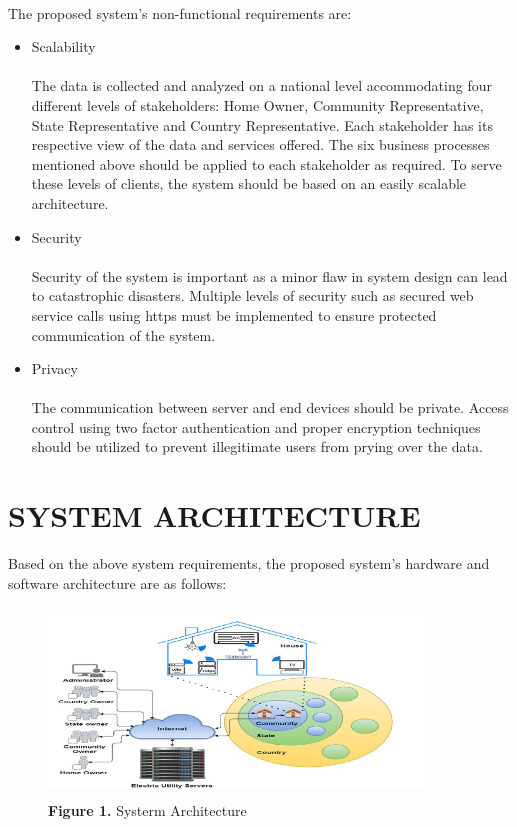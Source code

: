 \documentclass[a4paper,12pt,oneside]{article}
\let\counterwithin\relax
\begin{document}
\paragraph{}
The proposed system’s non-functional requirements are:
\begin{itemize}
    \item Scalability
    \paragraph{}The data is collected and analyzed on a national level
    accommodating four different levels of stakeholders: Home
    Owner, Community Representative, State Representative
    and Country Representative. Each stakeholder has
    its respective view of the data and services offered. The
    six business processes mentioned above should be applied
    to each stakeholder as required. To serve these levels of
    clients, the system should be based on an easily scalable
    architecture.
    \item Security
    \paragraph{}Security of the system is important as a minor flaw in
    system design can lead to catastrophic disasters. Multiple
    levels of security such as secured web service calls using https
    must be implemented to ensure protected communication of
    the system.
    \item Privacy
    \paragraph{}
    The communication between server and end devices should
    be private. Access control using two factor authentication and
    proper encryption techniques should be utilized to prevent
    illegitimate users from prying over the data.
    
\end{itemize}

\newpage
\section{SYSTEM ARCHITECTURE}
Based on the above system requirements, the proposed
system’s hardware and software architecture are as follows:

\begin{figure}[H]
\includegraphics[height=5cm,width=10cm]{figure1.png}
\centering
\caption{\textbf{Figure 1.} Systerm Architecture}
\end{figure}
\end{document}
